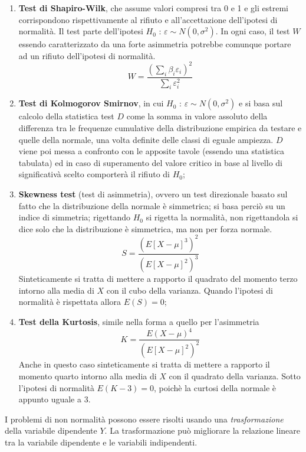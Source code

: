 \documentclass[a4page, 11pt]{article} %
\begin{document}
\begin{enumerate}[noitemsep]
\item \textbf{Test di Shapiro-Wilk}, che assume valori compresi tra 0 e 1 e gli estremi corrispondono rispettivamente al rifiuto e all’accettazione dell’ipotesi di normalità. Il test parte dell'ipotesi $H_0$ : $\varepsilon\sim N(0,\sigma^2)$. In ogni caso, il test $W$ essendo caratterizzato da una forte asimmetria  potrebbe comunque portare ad un rifiuto dell'ipotesi di normalità.
\begin{equation*}
W = \frac{(\sum_i \beta_i \varepsilon_i)^2}{\sum_i 			\varepsilon_i^2}
\end{equation*}
\item \textbf{Test di Kolmogorov Smirnov}, in cui $H_0$ : $\varepsilon\sim N(0,\sigma^2)$ e si basa sul calcolo della statistica test $D$ come la somma in valore assoluto della differenza tra le frequenze cumulative della distribuzione empirica da testare e quelle della normale, una volta definite delle classi di eguale ampiezza. $D$ viene poi messa a confronto con le apposite tavole (essendo una statistica tabulata) ed in caso di superamento del valore critico in base al livello di significativà scelto comporterà il rifiuto di $H_0$;
\item \textbf{Skewness test} (test di asimmetria), ovvero un test direzionale basato sul fatto che la distribuzione della normale è simmetrica; si basa perciò su un indice di simmetria; rigettando $H_0$ si rigetta la normalità, non rigettandola si dice solo che la distribuzione è simmetrica, ma non per forza normale.
\begin{equation*}
S = \frac{(E[X-\mu]^3)^2}{(E[X-\mu]^2)^3}
\end{equation*}
Sinteticamente si tratta di mettere a rapporto il quadrato del momento terzo intorno alla media di $X$ con il cubo della varianza.
\newline
Quando l'ipotesi di normalità è rispettata allora $E(S) = 0$;
\item \textbf{Test della Kurtosis}, simile nella forma a quello per l'asimmetria
\begin{equation*}
K = \frac{E(X-\mu)^4}{(E[X-\mu]^2)^2}
\end{equation*}
Anche in questo caso sinteticamente si tratta di mettere a rapporto il momento quarto intorno alla media di $X$ con il quadrato della varianza.
\newline
Sotto l'ipotesi di normalità $E(K-3) = 0$, poichè la curtosi della normale è appunto uguale a 3.
\end{enumerate}
I problemi di non normalità possono essere risolti usando una \textit{trasformazione} della variabile dipendente $Y$. La trasformazione può migliorare la relazione lineare tra la variabile dipendente e le variabili indipendenti.
\end{document}
